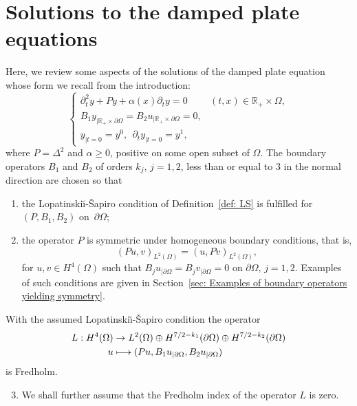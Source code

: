 \documentclass[10pt]{amsart}
\newenvironment{enumeratei}
{\bgroup\def\theenumi{\roman{enumi}}\def\theenumii{\arabic{enumii}}\begin{enumerate}}
{\end{enumerate}\egroup}
\newcommand\mto{\mathchoice{\longmapsto}{\mapsto}{\mapsto}{\mapsto}}
\theoremstyle{plain}
\theoremstyle{definition}
\def\R{\mathbb{R}}
\newcommand{\LS}{Lopatinski\u{\i}-\v{S}apiro\xspace}
\newcommand{\inp}[2]{(#1, #2)}
\begin{document}
\section{Solutions to the damped plate equations}
\label{sec: Solutions to the damped plate equations}
Here, we review some aspects of the solutions of the damped plate
equation whose form we recall from the introduction:
\begin{equation}
\label{eq: damped-plate equation}
\begin{cases}
\partial^2_ty +P y+\alpha(x)\partial_t y =0
&(t,x) \in \R_+ \times\Omega,\\
B_1 y_{|\R_+ \times\partial \Omega}= B_2u_{|\R_+ \times\partial \Omega}=0,\\
y_{|t=0}=y^0, \ \ \partial_t y_{|t=0}=y^1,
\end{cases}
\end{equation}
where $P = \Delta^2$ and $\alpha\geq 0$, positive on some open subset
of $\Omega$. The boundary operators $B_1$
and $B_2$ of orders $k_j$, $j=1,2$, less than or equal to $3$ in the normal direction are chosen so that
\begin{enumeratei}
\item
the \LS condition of Definition~\ref{def: LS} is fulfilled for $(P,
B_1, B_2)$ on~$\partial\Omega$;
\item
the operator $P$ is symmetric under homogeneous boundary
conditions, that is,
\begin{equation}
\label{eq: symmetry property}
\inp{Pu }{v}_{L^2(\Omega)} = \inp{u}{P v}_{L^2(\Omega)},
\end{equation}
for $u, v \in H^4(\Omega)$ such that $B_j u_{|\partial \Omega} = B_j v_{|\partial \Omega} =
0$ on $\partial\Omega$, $j=1,2$. Examples of such conditions are
given in Section~\ref{sec: Examples of boundary operators yielding symmetry}.
\end{enumeratei}
With the assumed \LS condition the operator
\begin{align}
\label{eq: Fredholm operator}
L: H^4 (\Omega) &\to L^2(\Omega) \oplus H^{7/2-k_1} (\partial \Omega)
\oplus H^{7/2-k_2} (\partial \Omega) \notag\\
u & \mto (Pu, B_1 u_{|\partial \Omega} , B_2 u_{|\partial \Omega})
\end{align}
is Fredholm.

\begin{enumeratei}\setcounter{enumi}{2}
\item
We shall further assume that the Fredholm index of the operator $L$ is zero.
\end{enumeratei}
\end{document}
